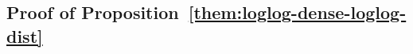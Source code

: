 

\subsection{Proof of Proposition~\ref{them:loglog-dense-loglog-dist}}
\label{sec:loglogdense_proof}

